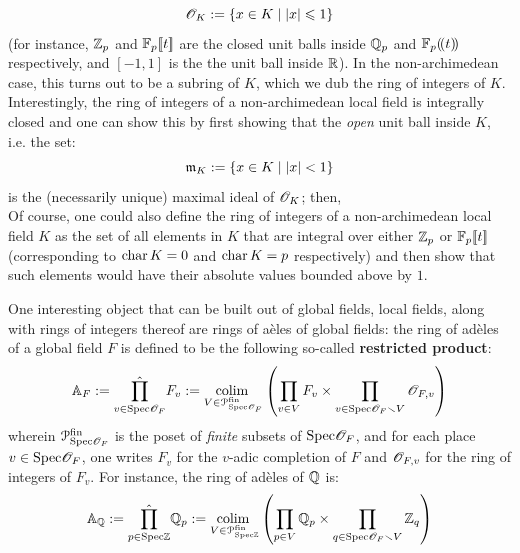\begin{example}
\begin{enumerate}
                        $$\mathscr{O}_K := \{x \in K \mid |x| \leqslant 1\}$$
                    (for instance, $\mathbb{Z}_p$ and $\mathbb{F}_p[\![t]\!]$ are the closed unit balls inside $\mathbb{Q}_p$ and $\mathbb{F}_p(\!(t)\!)$ respectively, and $[-1, 1]$ is the the unit ball inside $\mathbb{R}$). In the non-archimedean case, this turns out to be a subring of $K$, which we dub the ring of integers of $K$. Interestingly, the ring of integers of a non-archimedean local field is integrally closed and one can show this by first showing that the \textit{open} unit ball inside $K$, i.e. the set:
                        $$\mathfrak{m}_K := \{x \in K \mid |x| < 1\}$$
                    is the (necessarily unique) maximal ideal of $\mathscr{O}_K$; then, 
                    \\
                    Of course, one could also define the ring of integers of a non-archimedean local field $K$ as the set of all elements in $K$ that are integral over either $\mathbb{Z}_p$ or $\mathbb{F}_p[\![t]\!]$ (corresponding to $\operatorname{char} K = 0$ and $\operatorname{char} K = p$ respectively) and then show that such elements would have their absolute values bounded above by $1$. 
                \end{enumerate}
                
                One interesting object that can be built out of global fields, local fields, along with rings of integers thereof are rings of a\`eles of global fields: the ring of ad\`eles of a global field $F$ is defined to be the following so-called \textbf{restricted product}:
                    $$\A_F := \hat{\prod_{v \in \Spec \scrO_F}} F_v := \underset{V \in \calP^{\fin}_{\Spec \scrO_F}}{\colim} \left(\prod_{v \in V} F_v \x \prod_{v \in \Spec \scrO_F \setminus V} \scrO_{F, v}\right)$$
                wherein $\mathcal{P}^{\mathrm{fin}}_{\mathrm{Spec} \mathscr{O}_F}$ is the poset of \textit{finite} subsets of $\mathrm{Spec} \mathscr{O}_F$, and for each place $v \in \mathrm{Spec} \mathscr{O}_F$, one writes $F_v$ for the $v$-adic completion of $F$ and $\mathscr{O}_{F, v}$ for the ring of integers of $F_v$. For instance, the ring of ad\`eles of $\mathbb{Q}$ is:
                    $$\A_{\Q} := \hat{\prod_{p \in \Spec \Z}} \Q_p := \underset{V \in \calP^{\fin}_{\Spec \Z}}{\colim} \left(\prod_{p \in V} \Q_p \x \prod_{q \in \Spec \scrO_F \setminus V} \Z_q\right)$$
            \end{example}
